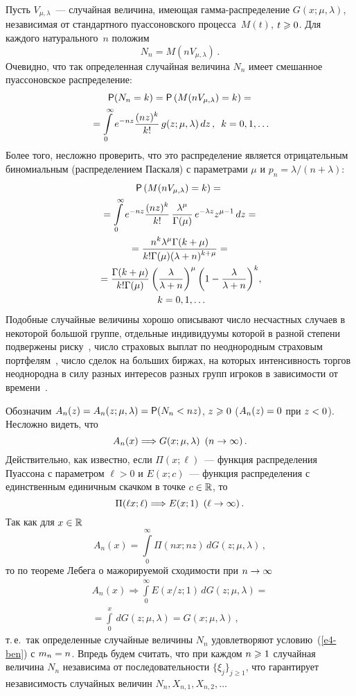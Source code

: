 \begin{multicols}{2}
Пусть $V_{\mu,\lambda}$~--- случайная величина, имеющая
гам\-ма-рас\-пре\-де\-ле\-ние $G(x;\mu,\lambda)$, независимая от стандартного
пуассоновского процесса~$M(t)$, $t\hm\geqslant0$. Для каждого натурального~$n$ положим
$$
N_n=M(nV_{\mu,\lambda})\,.
$$
Очевидно, что так определенная случайная величина $N_n$ имеет
смешанное пуассоновское распределение:
\begin{multline*}
{\sf P}(N_n=k)={\sf P}\left(M(nV_{\mu,\lambda})=k\right)=\\
{}=
\int\limits_0^{\infty}e^{-nz}\displaystyle\frac{\displaystyle (nz)^k\mathstrut}{\displaystyle k!\mathstrut}\,g(z;\mu,\lambda)\,dz\,,\enskip
k=0,1,\ldots
\end{multline*}
Более того, несложно проверить, что это распределение является
отрицательным биномиальным (распределением Паскаля) с параметрами
$\mu$ и $p_n={\lambda}/(n+\lambda)$:
\begin{multline}
{\sf P}\left(M(nV_{\mu,\lambda})=k\right)={}\\
{}=\int\limits_0^{\infty}e^{-nz}
\displaystyle\frac{\displaystyle (nz)^k\mathstrut}{\displaystyle k!\mathstrut}\,\displaystyle\frac{\displaystyle \lambda^{\mu}\mathstrut}{\displaystyle \Gamma(\mu)\mathstrut}\,e^{-\lambda z}z^{\mu-1}\,dz={}\\
{}=
\displaystyle\frac{\displaystyle n^k\lambda^{\mu}\Gamma(k+\mu)\mathstrut}{\displaystyle k!\Gamma(\mu)(\lambda+n)^{k+\mu}\mathstrut}={}\\
{}
=\displaystyle\frac{\displaystyle \Gamma(k+\mu)\mathstrut}{\displaystyle k!\Gamma(\mu)\mathstrut}\left(\displaystyle\frac{\displaystyle \lambda\mathstrut}{\displaystyle \lambda+n\mathstrut}\right)^{\mu}
\left(1-\displaystyle\frac{\displaystyle \lambda\mathstrut}{\displaystyle \lambda+n\mathstrut}\right)^k\!,\\ 
k=0,1,\ldots\!\!
\label{e5-ben}
\end{multline}
Подобные случайные величины хорошо описывают число несчастных
случаев в некоторой большой группе, отдельные индивидуумы которой в
разной степени подвержены риску~\cite{GreenwoodYule1920}, число
страховых выплат по неоднородным страховым портфелям~\cite{KorolevBeningShorgin2011}, 
чис\-ло сделок на больших биржах, на
которых интенсивность торгов неоднородна в силу разных интересов
разных групп игроков в зависимости от времени~\cite{Korolev2011}.

Обозначим $A_n(z)=A_n(z;\mu,\lambda)\hm={\sf P}(N_n<nz)$, $z\hm\geqslant0$
($A_n(z)\hm=0$ при $z\hm<0$). Несложно видеть, что
$$
A_n(x)\Longrightarrow G(x;\mu,\lambda)\enskip (n\to\infty)\,.
$$
Действительно, как известно, если $\Pi(x;\ell)$~--- функция
распределения Пуассона с параметром $\ell>0$ и $E(x;c)$~--- функция
распределения с единственным единичным скачком в точке $c\hm\in\r$, то
$$
\Pi(\ell x;\ell)\Longrightarrow E(x;1)\enskip (\ell\to\infty)\,.
$$
Так как для $x\in\mathbb{R}$
$$
A_n(x)=\int\limits_{0}^{\infty}\Pi(n x; n z)\,dG(z;\mu,\lambda)\,,
$$
то по теореме Лебега о мажорируемой сходимости при $n\hm\to\infty$
\begin{multline*}
A_n(x)\Longrightarrow\int\limits_{0}^{\infty}E(x/z;1)\,dG(z;\mu,\lambda)={}\\
{}=
\int\limits_{0}^{x}\,dG(z;\mu,\lambda)=G(x;\mu,\lambda)\,,
\end{multline*}
т.\,е.\ так определенные случайные величины $N_n$ удов\-ле\-тво\-ря\-ют
условию~(\ref{e4-ben}) с $m_n\hm=n$. Впредь будем считать, что при каждом $n\hm\geqslant1$
случайная величина $N_n$ независима от последовательности
$\{\xi_j\}_{j\geqslant1}$, что гарантирует независимость случайных величин
$N_n,X_{n,1},X_{n,2},\ldots$


\end{multicols}
